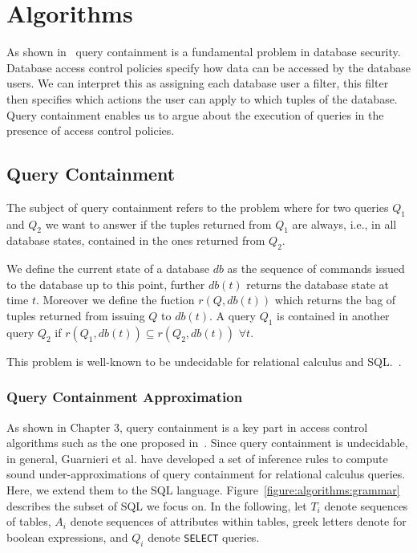 \section{Algorithms}

As shown in~\cite{guarnieri2014optimal} query containment is a fundamental problem in database security.
%
Database access control policies specify how data can be accessed by the database users.
%
We can interpret this as assigning each database user a filter, this filter then specifies which actions the user can apply to which tuples of the database.
%
Query containment enables us to argue about the execution of queries in the presence of access control policies.
%

\subsection{Query Containment}

The subject of query containment refers to the problem where for two queries $Q_1$ and $Q_2$ we want to answer if the tuples returned from $Q_1$ are always, i.e., in all database states, contained in the ones returned from $Q_2$.

We define the current state of a database $db$ as the sequence of commands issued to the database up to this point, further $db(t)$ returns the database state at time $t$.
%
Moreover we define the fuction $r(Q, db(t))$ which returns the bag of tuples returned from issuing $Q$ to $db(t)$.
%
A query $Q_1$ is contained in another query $Q_2$ if $r(Q_1, db(t)) \subseteq r(Q_2, db(t))$ $\forall t$.

This problem is well-known to be undecidable for relational calculus and SQL.~\cite{abiteboul1995foundations}.

\subsubsection{Query Containment Approximation}

As shown in Chapter 3, query containment is a key part in access control algorithms such as the one proposed in~\cite{guarnieri2016strong}.
Since query containment is undecidable, in general, Guarnieri et al. have developed a set of inference rules to compute sound under-approximations of query containment for relational calculus queries.
%
Here, we extend them to the SQL language.
%
Figure~\ref{figure:algorithms:grammar} describes the subset of SQL we focus on. 
%
In the following, let $T_i$ denote sequences of tables, $A_i$ denote sequences of attributes within tables, greek letters denote for boolean expressions, and $Q_i$ denote \texttt{SELECT} queries.


